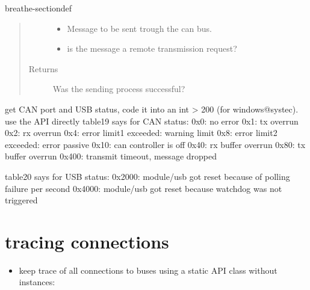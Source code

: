 \documentclass[a4paper,10pt,english]{sphinxmanual}
\begin{document}
\begin{fulllineitems}
\begin{sphinxuseclass}{breathe-sectiondef}
\begin{fulllineitems}
\begin{quote}
\begin{description}
\begin{itemize}
\item {} 
\sphinxAtStartPar
{} \textendash{} Message to be sent trough the can bus. 

\item {} 
\sphinxAtStartPar
{} \textendash{} is the message a remote transmission request? 

\end{itemize}

\item[{Returns}] \leavevmode
\sphinxAtStartPar
Was the sending process successful? 

\end{description}\end{quote}

\end{fulllineitems}


\begin{fulllineitems}
\label{\detokenize{classestracing:_CPPv4N9STCanScan13getPortStatusEv}}%
\pysigstartmultiline
{}%
\pysigstopmultiline
\sphinxAtStartPar
get CAN port and USB status, code it into an int \textgreater{} 200 (for windows@systec). use the API directly table19 says for CAN status: 0x0: no error 0x1: tx overrun 0x2: rx overrun 0x4: error limit1 exceeded: warning limit 0x8: error limit2 exceeded: error passive 0x10: can controller is off 0x40: rx buffer overrun 0x80: tx buffer overrun 0x400: transmit timeout, message dropped

\sphinxAtStartPar
table20 says for USB status: 0x2000: module/usb got reset because of polling failure per second 0x4000: module/usb got reset because watchdog was not triggered 

\end{fulllineitems}


\end{sphinxuseclass}
\end{fulllineitems}



\section{tracing connections}
\label{\detokenize{classestracing:tracing-connections}}\begin{itemize}
\item {} 
\sphinxAtStartPar
keep trace of all connections to buses using a static API class without instances:

\end{itemize}
\end{document}
